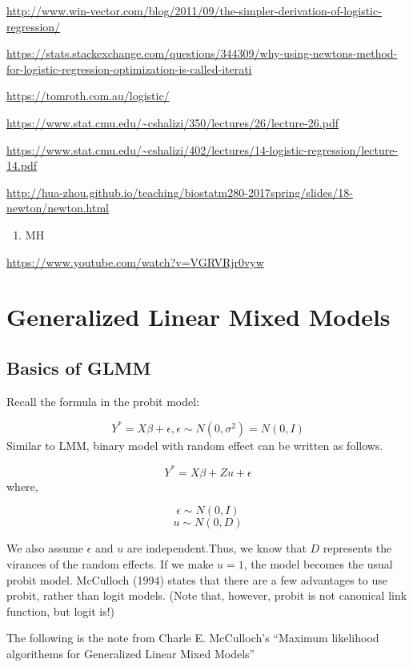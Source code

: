 \documentclass[]{book}
\providecommand{\tightlist}{%
  \setlength{\itemsep}{0pt}\setlength{\parskip}{0pt}}
\begin{document}
\url{http://www.win-vector.com/blog/2011/09/the-simpler-derivation-of-logistic-regression/}

\url{https://stats.stackexchange.com/questions/344309/why-using-newtons-method-for-logistic-regression-optimization-is-called-iterati}

\url{https://tomroth.com.au/logistic/}

\url{https://www.stat.cmu.edu/~cshalizi/350/lectures/26/lecture-26.pdf}

\url{https://www.stat.cmu.edu/~cshalizi/402/lectures/14-logistic-regression/lecture-14.pdf}

\url{http://hua-zhou.github.io/teaching/biostatm280-2017spring/slides/18-newton/newton.html}

\begin{enumerate}
\def\labelenumi{\arabic{enumi}.}
\setcounter{enumi}{2}
\tightlist
\item
  MH
\end{enumerate}

\url{https://www.youtube.com/watch?v=VGRVRjr0vyw}

\chapter{Generalized Linear Mixed
Models}\label{generalized-linear-mixed-models}

\section{Basics of GLMM}\label{basics-of-glmm}

Recall the formula in the probit model:

\[Y^*=X\beta+\epsilon, \epsilon \sim N(0,\sigma^2)=N(0,I)\] Similar to
LMM, binary model with random effect can be written as follows.

\[Y^*=X\beta+ Z u+\epsilon\] where,

\[\epsilon \sim N(0,I)\] \[u \sim N(0, D)\]

We also assume \(\epsilon\) and \(u\) are independent.Thus, we know that
\(D\) represents the virances of the random effects. If we make
\(u =1\), the model becomes the usual probit model. McCulloch (1994)
states that there are a few advantages to use probit, rather than logit
models. (Note that, however, probit is not canonical link function, but
logit is!)

The following is the note from Charle E. McCulloch's ``Maximum
likelihood algorithems for Generalized Linear Mixed Models''
\end{document}
